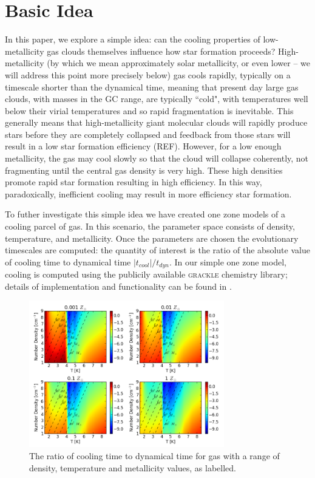 \documentclass[useAMS,usenatbib]{mn2e}
\begin{document}
%
\section{Basic Idea}
\label{sec:basic}

In this paper, we explore a simple idea: can the cooling properties of low-metallicity gas clouds themselves influence how star formation proceeds?  High-metallicity (by which we mean approximately solar metallicity, or even lower -- we will address this point more precisely below) gas cools rapidly, typically on a timescale shorter than the dynamical time, meaning that present day large gas clouds, with masses in the GC range, are typically ``cold", with temperatures well below their virial temperatures and so rapid fragmentation is inevitable.  This generally means that high-metallicity giant molecular clouds will rapidly produce stars before they are completely collapsed and feedback from those stars will result in a low star formation efficiency (REF).  However, for a low enough metallicity, the gas may cool slowly so that the cloud will collapse coherently, not fragmenting until the central gas density is very high.  These high densities promote rapid star formation resulting in high efficiency.  In this way, paradoxically, inefficient cooling may result in more efficiency star formation.

To futher investigate this simple idea we have created one zone models of a cooling parcel of gas. In 
this scenario, the parameter space consists of density, temperature, and metallicity. Once the parameters
are chosen the evolutionary timescales are computed: the quantity of interest is the ratio of the absolute value of cooling
time to dynamical time $|t_{cool}|/t_{dyn}$. In our simple one zone model, cooling is computed using the
publicily available \textsc{grackle} chemistry library; details of implementation and functionality can be found
in \cite{Bryan2014}.
\begin{figure}
\begin{center}
\mbox{\includegraphics[width=8.5cm]{Images/cooling_to_freefall_no_background}}
\end{center}
\caption{\label{fig:cooling_to_freefall} The ratio of cooling time to dynamical time for gas with a range of density, temperature and metallicity values, as labelled.}
\end{figure}
\end{document}
